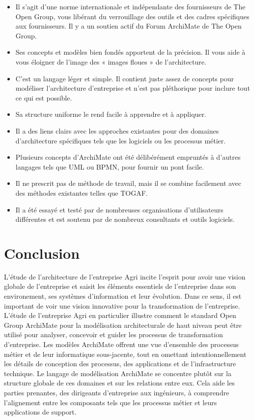 \documentclass[a4paper]{report}
\begin{document}
\begin{doublespace}
\begin{itemize}
\item
  Il s'agit d'une norme internationale et indépendante des fournisseurs
  de The Open Group, vous libérant du verrouillage des outils et des
  cadres spécifiques aux fournisseurs. Il y a un soutien actif du Forum
  ArchiMate de The Open Group.
\item
  Ses concepts et modèles bien fondés apportent de la précision. Il vous
  aide à vous éloigner de l'image des « images floues » de
  l'architecture.
\item
  C'est un langage léger et simple. Il contient juste assez de concepts
  pour modéliser l'architecture d'entreprise et n'est pas pléthorique
  pour inclure tout ce qui est possible.
\item
  Sa structure uniforme le rend facile à apprendre et à appliquer.
\item
  Il a des liens clairs avec les approches existantes pour des domaines
  d'architecture spécifiques tels que les logiciels ou les processus
  métier.
\item
  Plusieurs concepts d'ArchiMate ont été délibérément empruntés à
  d'autres langages tels que UML ou BPMN, pour fournir un pont facile.
\item
  Il ne prescrit pas de méthode de travail, mais il se combine
  facilement avec des méthodes existantes telles que TOGAF.
\item
  Il a été essayé et testé par de nombreuses organisations
  d'utilisateurs différentes et est soutenu par de nombreux consultants
  et outils logiciels.
\end{itemize}

\chapter*{\centering Conclusion}
L'étude de l'architecture de l'entreprise Agri incite l'esprit pour
avoir une vision globale de l'entreprise et saisit les éléments
essentiels de l'entreprise dans son environement, ses systèmes d'information et leur évolution. Dans ce sens, il est
important de voir une vision innovative pour la transformation de l'entreprise. L'étude de l'entreprise Agri en
particulier illustre comment le standard Open Group ArchiMate pour la
modélisation architecturale de haut niveau peut être utilisé pour analyser, concevoir et guider les processus de transformation
d'entreprise. Les modèles ArchiMate offrent une vue d'ensemble des processus métier et de leur
informatique sous-jacente, tout en omettant intentionnellement les détails de conception des
processus, des applications et de l'infrastructure technique. Le langage de modélisation ArchiMate se
concentre plutôt sur la structure globale de ces domaines et sur les relations entre eux. Cela
aide les parties prenantes, des dirigeants d'entreprise aux ingénieurs, à comprendre l'alignement
entre les composants tels que les processus métier et leurs applications de support.

\end{doublespace}
\end{document}
